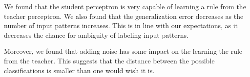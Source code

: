 We found that the student perceptron is very capable of learning a rule from the teacher perceptron. 
We also found that the generalization error decreases as the number of input patterns increases. 
This is in line with our expectations, as it decreases the chance for ambiguity of labeling input patterns.

Moreover, we found that adding noise has some impact on the learning the rule from the teacher. 
This suggests that the distance between the possible classifications is smaller than one would wish it is.